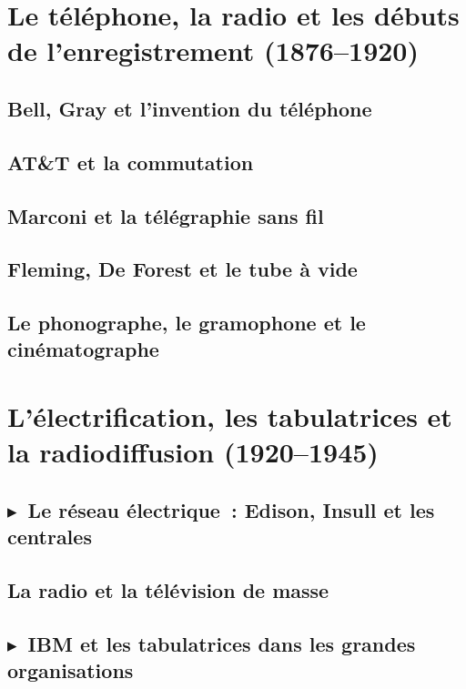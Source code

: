 \section{Le téléphone, la radio et les débuts de l'enregistrement (1876--1920)}\label{sec:telephone}

\subsection{Bell, Gray et l'invention du téléphone}\label{subsec:bell}

\subsection{AT\&T et la commutation}\label{subsec:att}

\subsection{Marconi et la télégraphie sans fil}\label{subsec:marconi}

\subsection{Fleming, De Forest et le tube à vide}\label{subsec:tube}

\subsection{Le phonographe, le gramophone et le cinématographe}\label{subsec:phonographe}


\section{L'électrification, les tabulatrices et la radiodiffusion (1920--1945)}\label{sec:electrification}

\subsection{$\blacktriangleright$~Le réseau électrique~: Edison, Insull et les centrales}\label{subsec:edison}

\subsection{La radio et la télévision de masse}\label{subsec:broadcasting}

\subsection{$\blacktriangleright$~IBM et les tabulatrices dans les grandes organisations}\label{subsec:ibm}

